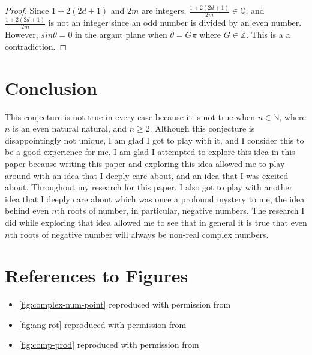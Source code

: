 \documentclass{article}
\begin{document}
\begin{proof}
     Since \(1 + 2(2d + 1)\) and \(2m\) are integers, \(\frac{1 + 2(2d + 1)}{2m} \in \mathds{Q}\), and \(\frac{1 + 2(2d + 1)}{2m}\) is not an integer since an odd number is divided by an even number. However, \(sin\theta = 0\) in the argant plane when \(\theta = G\pi\) where \(G \in \mathds{Z}\). This is a a contradiction. 
\end{proof} 

\section{Conclusion} 

This conjecture is not true in every case because it is not true when \(n \in \mathds{N}\), where \(n\) is an even natural natural, and \(n \geq 2\).  Although this conjecture is disappointingly not unique, I am glad I got to play with it, and I consider this to be a good experience for me. I am glad I attempted to explore this idea in this paper because writing this paper and exploring this idea allowed me to play around with an idea that I deeply care about, and an idea that I was excited about. Throughout my research for this paper, I also got to play with another idea that I deeply care about which was once a profound mystery to me, the idea behind even \(n\)th roots of number, in particular, negative numbers. The research I did while exploring that idea allowed me to see that in general it is true that even \(n\)th roots of negative number will always be non-real complex numbers. 


 

\section*{References to Figures} 

\begin{itemize}
    \item \cref{fig:complex-num-point} reproduced with permission from \cite{highermath2024} 
    \item \cref{fig:ang-rot} reproduced with permission from \cite{byju's2024} 
    \item \cref{fig:comp-prod} reproduced with permission from \cite{byju's2024prod}
\end{itemize} 
\end{document}
